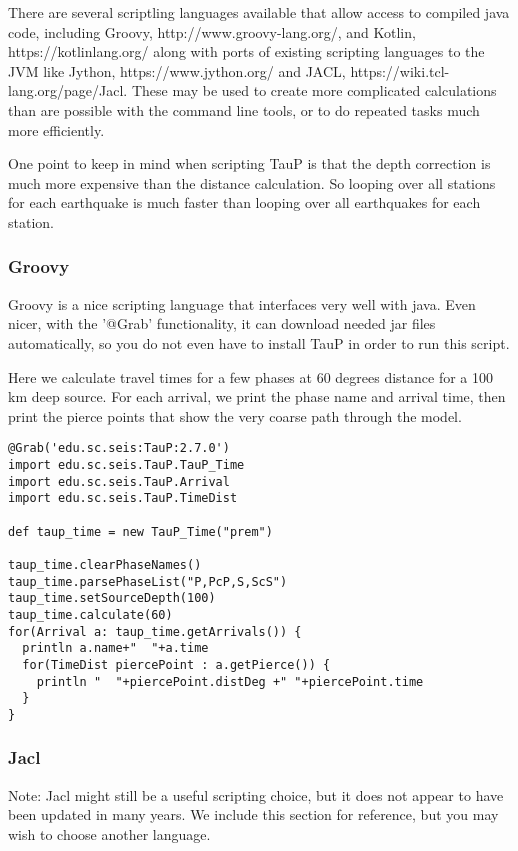 There are several scriptling languages available that allow access to compiled
java code, including Groovy, http://www.groovy-lang.org/, and Kotlin,
https://kotlinlang.org/ along with ports of existing scripting
languages to the JVM like
Jython, https://www.jython.org/ and JACL, https://wiki.tcl-lang.org/page/Jacl.
These may be used to create more complicated
calculations than are possible with the command line tools, or to do repeated
tasks much more efficiently.

One point to keep in mind when scripting TauP is that the depth correction is
much more expensive than the distance calculation. So looping over all
stations for each earthquake is much faster than looping over all earthquakes
for each station.

\subsubsection{Groovy}

Groovy is a nice scripting language that interfaces very well with java. Even nicer, with the '@Grab' functionality, it can download needed jar files automatically, so you do
not even have to install TauP in order to run this script.

Here we calculate travel times for a few phases at 60 degrees distance
for a 100 km deep source. For each arrival, we print the phase name
and arrival time, then print the pierce points that show the very coarse
path through the model.

\begin{verbatim}
@Grab('edu.sc.seis:TauP:2.7.0')
import edu.sc.seis.TauP.TauP_Time
import edu.sc.seis.TauP.Arrival
import edu.sc.seis.TauP.TimeDist

def taup_time = new TauP_Time("prem")

taup_time.clearPhaseNames()
taup_time.parsePhaseList("P,PcP,S,ScS")
taup_time.setSourceDepth(100)
taup_time.calculate(60)
for(Arrival a: taup_time.getArrivals()) {
  println a.name+"  "+a.time
  for(TimeDist piercePoint : a.getPierce()) {
    println "  "+piercePoint.distDeg +" "+piercePoint.time
  }
}
\end{verbatim}

\subsubsection{Jacl}

Note: Jacl might still be a useful scripting choice, but it does not appear to have
been updated in many years. We include this section for reference,
but you may wish to choose another language.

